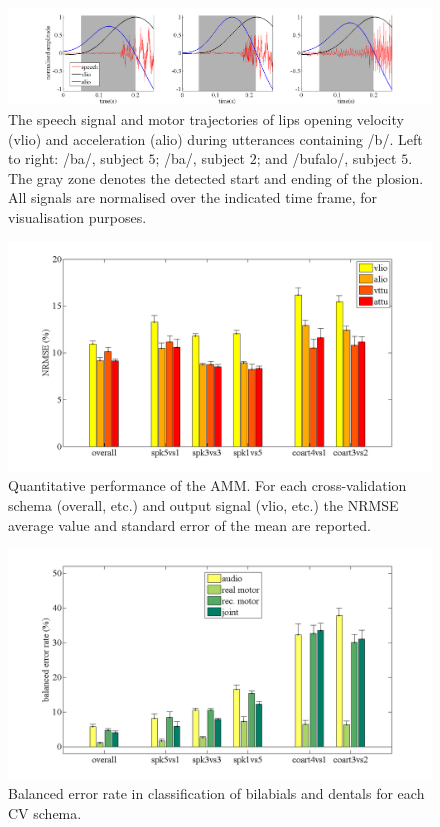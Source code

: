 \documentclass{pnastwo}
\newcommand{\vlio}{\textsf{vlio}}
\newcommand{\alio}{\textsf{alio}}
\begin{document}

\begin{figure}[t]
  \centerline{\includegraphics[width=\textwidth]{figs/samples}}
  \caption{The speech signal and motor trajectories of lips opening
    velocity (\vlio) and acceleration (\alio) during utterances containing /b/.
    Left to right: /ba/, subject $5$; /ba/, subject $2$; and /bufalo/, subject $5$.
    The gray zone denotes the detected start and ending of the plosion. All signals
    are normalised over the indicated time frame, for visualisation purposes.}
  \label{fig:isdView}
\end{figure}

\begin{figure}[t]
  \centerline{\includegraphics[width=\textwidth]{figs/AMM}}
  \caption{Quantitative performance of the AMM. For each cross-validation schema (overall, etc.)
    and output signal (\vlio, etc.) the NRMSE average value and standard error of the mean
    are reported.}
  \label{fig:amm_perf}
\end{figure}



\begin{figure}[t]
  \centerline{\includegraphics[width=\textwidth]{figs/exp2}}
  \caption{Balanced error rate in classification of bilabials and dentals for each
    CV schema.}
  \label{fig:class2_perf}
\end{figure}
\end{document}
